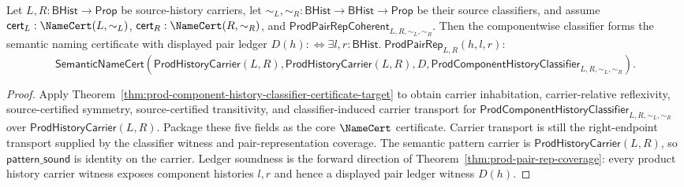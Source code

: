 \begin{theorem}
\label{thm:prod-component-history-semantic-certificate-target}
Let $L,R:\mathsf{BHist}\to\mathsf{Prop}$ be source-history carriers, let
$\sim_L,\sim_R:\mathsf{BHist}\to\mathsf{BHist}\to\mathsf{Prop}$ be their source
classifiers, and assume $\mathsf{cert}_L:\NameCert(L,\sim_L)$,
$\mathsf{cert}_R:\NameCert(R,\sim_R)$, and
$\mathsf{ProdPairRepCoherent}_{L,R,\sim_L,\sim_R}$. Then the componentwise
classifier forms the semantic naming certificate with displayed pair ledger
$D(h):\Longleftrightarrow
\exists l,r:\mathsf{BHist}.\;\mathsf{ProdPairRep}_{L,R}(h,l,r)$:
$$
\mathsf{SemanticNameCert}(\mathsf{ProdHistoryCarrier}(L,R),
\mathsf{ProdHistoryCarrier}(L,R),
D,
\mathsf{ProdComponentHistoryClassifier}_{L,R,\sim_L,\sim_R}).
$$
\end{theorem}
\begin{proof}
Apply Theorem~\ref{thm:prod-component-history-classifier-certificate-target} to
obtain carrier inhabitation, carrier-relative reflexivity, source-certified
symmetry, source-certified transitivity, and classifier-induced carrier
transport for
$\mathsf{ProdComponentHistoryClassifier}_{L,R,\sim_L,\sim_R}$ over
$\mathsf{ProdHistoryCarrier}(L,R)$. Package these five fields as the core
$\NameCert$ certificate. Carrier transport is still the right-endpoint
transport supplied by the classifier witness and pair-representation coverage.
The semantic pattern carrier is $\mathsf{ProdHistoryCarrier}(L,R)$, so
$\mathsf{pattern\_sound}$ is identity on the carrier. Ledger soundness is the
forward direction of Theorem~\ref{thm:prod-pair-rep-coverage}: every product
history carrier witness exposes component histories $l,r$ and hence a displayed
pair ledger witness $D(h)$.
\end{proof}

